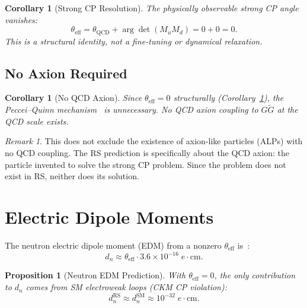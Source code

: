 \documentclass[12pt,a4paper]{article}
\newtheorem{corollary}[theorem]{Corollary}
\newtheorem{proposition}[theorem]{Proposition}
\theoremstyle{definition}
\theoremstyle{remark}
\newtheorem{remark}[theorem]{Remark}
\begin{document}
\begin{corollary}[Strong CP Resolution]
\label{cor:theta-eff}
The physically observable strong CP angle vanishes:
\begin{equation}
  \theta_{\mathrm{eff}} = \theta_{\mathrm{QCD}} +
  \arg\!\det(M_u M_d) = 0 + 0 = 0.
\end{equation}
This is a structural identity, not a fine-tuning or dynamical
relaxation.
\end{corollary}

\subsection{No Axion Required}

\begin{corollary}[No QCD Axion]
\label{cor:no-axion}
Since $\theta_{\mathrm{eff}} = 0$ structurally
(Corollary~\ref{cor:theta-eff}), the Peccei--Quinn
mechanism~\cite{PQ} is unnecessary.  No QCD axion
coupling to $G\tilde{G}$ at the QCD scale exists.
\end{corollary}

\begin{remark}
This does not exclude the existence of axion-like particles
(ALPs) with no QCD coupling.  The RS prediction is specifically
about the QCD axion: the particle invented to solve the strong
CP problem.  Since the problem does not exist in RS, neither
does its solution.
\end{remark}

\section{Electric Dipole Moments}
\label{sec:edm}

The neutron electric dipole moment (EDM) from a nonzero
$\theta_{\mathrm{eff}}$ is~\cite{Pospelov2005}:
\begin{equation}
  d_n \approx \theta_{\mathrm{eff}} \cdot
  3.6 \times 10^{-16}\;e\cdot\mathrm{cm}.
\end{equation}

\begin{proposition}[Neutron EDM Prediction]
\label{prop:nedm}
With $\theta_{\mathrm{eff}} = 0$, the only contribution to
$d_n$ comes from SM electroweak loops (CKM CP violation):
\begin{equation}
  d_n^{\mathrm{RS}} \approx d_n^{\mathrm{SM}} \approx
  10^{-32}\;e\cdot\mathrm{cm}.
\end{equation}
\end{proposition}
\end{document}

